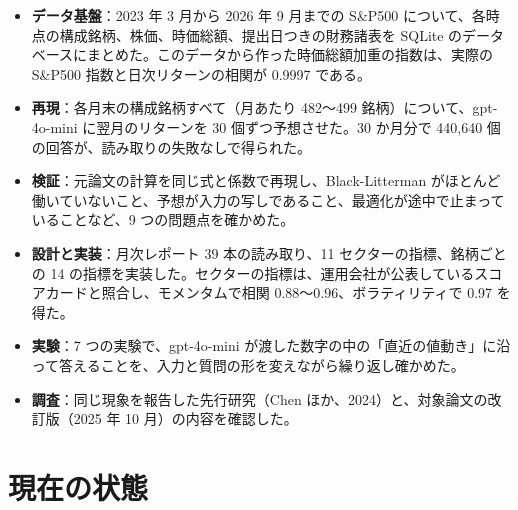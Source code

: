 \documentclass[xelatex,ja=standard,jafont=hiragino-pron,a4paper,10pt]{bxjsreport}
\newcommand{\SP}{S\&P500}
\begin{document}
\begin{itemize}
\item \textbf{データ基盤}：2023 年 3 月から 2026 年 9 月までの \SP{} について、各時点の構成銘柄、株価、時価総額、提出日つきの財務諸表を SQLite のデータベースにまとめた。このデータから作った時価総額加重の指数は、実際の \SP{} 指数と日次リターンの相関が 0.9997 である。
\item \textbf{再現}：各月末の構成銘柄すべて（月あたり 482〜499 銘柄）について、gpt-4o-mini に翌月のリターンを 30 個ずつ予想させた。30 か月分で 440,640 個の回答が、読み取りの失敗なしで得られた。
\item \textbf{検証}：元論文の計算を同じ式と係数で再現し、Black-Litterman がほとんど働いていないこと、予想が入力の写しであること、最適化が途中で止まっていることなど、9 つの問題点を確かめた。
\item \textbf{設計と実装}：月次レポート 39 本の読み取り、11 セクターの指標、銘柄ごとの 14 の指標を実装した。セクターの指標は、運用会社が公表しているスコアカードと照合し、モメンタムで相関 0.88〜0.96、ボラティリティで 0.97 を得た。
\item \textbf{実験}：7 つの実験で、gpt-4o-mini が渡した数字の中の「直近の値動き」に沿って答えることを、入力と質問の形を変えながら繰り返し確かめた。
\item \textbf{調査}：同じ現象を報告した先行研究（Chen ほか、2024）と、対象論文の改訂版（2025 年 10 月）の内容を確認した。
\end{itemize}

\section{現在の状態}
\end{document}

